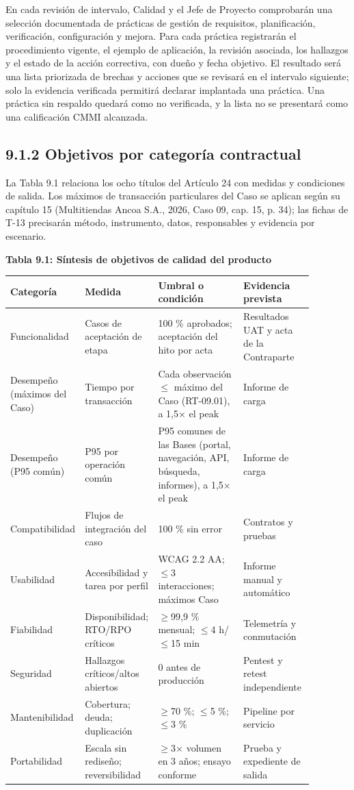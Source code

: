 \documentclass[11pt]{article}
\begin{document}
En cada revisión de intervalo, Calidad y el Jefe de Proyecto comprobarán una selección documentada de prácticas de gestión de requisitos, planificación, verificación, configuración y mejora. Para cada práctica registrarán el procedimiento vigente, el ejemplo de aplicación, la revisión asociada, los hallazgos y el estado de la acción correctiva, con dueño y fecha objetivo. El resultado será una lista priorizada de brechas y acciones que se revisará en el intervalo siguiente; solo la evidencia verificada permitirá declarar implantada una práctica. Una práctica sin respaldo quedará como no verificada, y la lista no se presentará como una calificación CMMI alcanzada.

\subsection{9.1.2 Objetivos por categoría contractual}

La Tabla 9.1 relaciona los ocho títulos del Artículo 24 con medidas y condiciones de salida. Los máximos de transacción particulares del Caso se aplican según su capítulo 15 (Multitiendas Ancoa S.A., 2026, Caso 09, cap. 15, p. 34); las fichas de T-13 precisarán método, instrumento, datos, responsables y evidencia por escenario.

\textbf{Tabla 9.1: Síntesis de objetivos de calidad del producto}\label{tab:9-1}

\begin{longtable}{p{0.16\linewidth}p{0.21\linewidth}p{0.28\linewidth}p{0.23\linewidth}}
\toprule
Categoría & Medida & Umbral o condición & Evidencia prevista \\
\midrule
\endhead
Funcionalidad & Casos de aceptación de etapa & 100 \% aprobados; aceptación del hito por acta & Resultados UAT y acta de la Contraparte \\
Desempeño (máximos del Caso) & Tiempo por transacción & Cada observación $\leq$ máximo del Caso (RT-09.01), a 1,5$\times$ el peak & Informe de carga \\
Desempeño (P95 común) & P95 por operación común & P95 comunes de las Bases (portal, navegación, API, búsqueda, informes), a 1,5$\times$ el peak & Informe de carga \\
Compatibilidad & Flujos de integración del caso & 100 \% sin error & Contratos y pruebas \\
Usabilidad & Accesibilidad y tarea por perfil & WCAG 2.2 AA; $\leq$3 interacciones; máximos Caso & Informe manual y automático \\
Fiabilidad & Disponibilidad; RTO/RPO críticos & $\geq$99,9 \% mensual; $\leq$4 h/$\leq$15 min & Telemetría y conmutación \\
Seguridad & Hallazgos críticos/altos abiertos & 0 antes de producción & Pentest y retest independiente \\
Mantenibilidad & Cobertura; deuda; duplicación & $\geq$70 \%; $\leq$5 \%; $\leq$3 \% & Pipeline por servicio \\
Portabilidad & Escala sin rediseño; reversibilidad & $\geq$3$\times$ volumen en 3 años; ensayo conforme & Prueba y expediente de salida \\
\bottomrule
\end{longtable}
\end{document}
